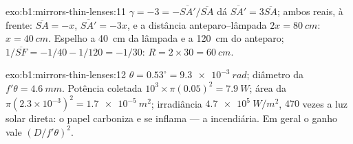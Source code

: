 \begin{solution}{exo:b1:mirrors-thin-lenses:11}
$\gamma = -3 = -\overline{SA'}/\overline{SA}$ dá $\overline{SA'} =
3\overline{SA}$; ambos reais, à frente: $\overline{SA} = -x$,
$\overline{SA'} = -3x$, e a distância anteparo--lâmpada $2x = \qty{80}{cm}$:
$x = \qty{40}{cm}$. Espelho a \qty{40}{cm} da lâmpada e a \qty{120}{cm}
do anteparo; $1/\overline{SF} = -1/40 - 1/120 = -1/30$:
$R = 2 \times 30 = \qty{60}{cm}$.
\end{solution}

\begin{solution}{exo:b1:mirrors-thin-lenses:12}
$\theta = 0.53^\circ = \qty{9.3e-3}{rad}$; diâmetro da  $f'\theta =
\qty{4.6}{mm}$. Potência coletada $10^3 \times \pi(0.05)^2 = \qty{7.9}{W}$;
área da  $\pi(2.3\times10^{-3})^2 = \qty{1.7e-5}{m^2}$; irradiância
$\qty{4.7e5}{W/m^2}$, $470$ vezes a luz solar direta: o papel carboniza e
se inflama --- a  incendiária. Em geral o ganho vale
$(D/f'\theta)^2$.
\end{solution}

